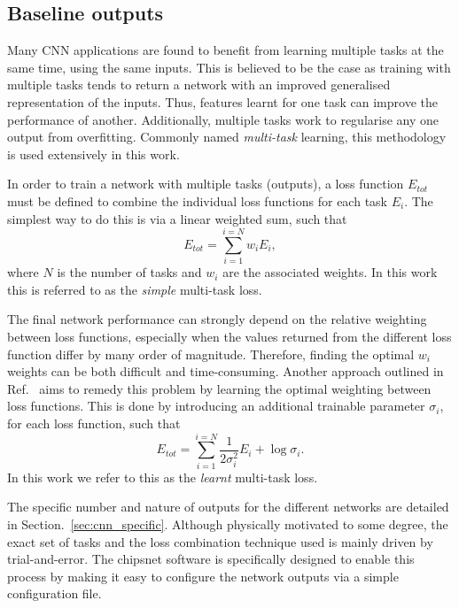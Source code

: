 \subsection{Baseline outputs} %
\label{sec:cnn_baseline_outputs} %

Many CNN applications are found to benefit from learning multiple tasks at the same time, using
the same inputs. This is believed to be the case as training with multiple tasks tends to return a
network with an improved generalised representation of the inputs. Thus, features learnt for one
task can improve the performance of another. Additionally, multiple tasks work to regularise any
one output from overfitting. Commonly named \emph{multi-task} learning, this methodology is used
extensively in this work.

In order to train a network with multiple tasks (outputs), a loss function $E_{tot}$ must be
defined to combine the individual loss functions for each task $E_{i}$. The simplest way to do
this is via a linear weighted sum, such that
\begin{equation}
    E_{tot} = \sum_{i=1}^{i=N}w_{i}E_{i},
    \label{eq:multi_simple}
\end{equation}
where $N$ is the number of tasks and $w_{i}$ are the associated weights. In this work this is
referred to as the \emph{simple} multi-task loss.

The final network performance can strongly depend on the relative weighting between loss
functions, especially when the values returned from the different loss function differ by many
order of magnitude. Therefore, finding the optimal $w_{i}$ weights can be both difficult and
time-consuming. Another approach outlined in Ref.~\cite{kendall2018} aims to remedy this problem
by learning the optimal weighting between loss functions. This is done by introducing an
additional trainable parameter $\sigma_{i}$, for each loss function, such that
\begin{equation}
    E_{tot}= \sum_{i=1}^{i=N}\frac{1}{2\sigma_{i}^2}E_{i}+ \log\sigma_{i}.
    \label{eq:multi_learnt}
\end{equation}
In this work we refer to this as the \emph{learnt} multi-task loss.

The specific number and nature of outputs for the different networks are detailed in
Section.~\ref{sec:cnn_specific}. Although physically motivated to some degree, the exact set of
tasks and the loss combination technique used is mainly driven by trial-and-error. The chipsnet
software is specifically designed to enable this process by making it easy to configure the
network outputs via a simple configuration file.

